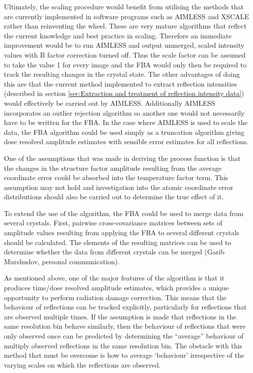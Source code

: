 Ultimately, the scaling procedure would benefit from utilising the methods that are currently implemented in software programs such as AIMLESS and XSCALE rather than reinventing the wheel.
These are very mature algorithms that reflect the current knowledge and best practice in scaling.
Therefore an immediate improvement would be to run AIMLESS and output unmerged, scaled intensity values with B factor correction turned off.
Thus the scale factor can be assumed to take the value 1 for every image and the FBA would only then be required to track the resulting changes in the crystal state.
The other advantages of doing this are that the current method implemented to extract reflection intensities (described in section \ref{sec:Extraction and treatment of reflection intensity data}) would effectively be carried out by AIMLESS.
Additionally AIMLESS incorporates an outlier rejection algorithm so another one would not necessarily have to be written for the FBA.
In the case where AIMLESS is used to scale the data, the FBA algorithm could be used simply as a truncation algorithm giving dose resolved amplitude estimates with sensible error estimates for all reflections.

One of the assumptions that was made in deriving the process function is that the changes in the structure factor amplitude resulting from the average coordinate error could be absorbed into the temperature factor term.
This assumption may not hold and investigation into the atomic coordinate error distributions should also be carried out to determine the true effect of it.

To extend the use of the algorithm, the FBA could be used to merge data from several crystals.
First, pairwise cross-covariance matrices between sets of amplitude values resulting from applying the FBA to several different crystals should be calculated.
The elements of the resulting matrices can be used to determine whether the data from different crystals can be merged (Garib Murshudov, personal communication).

As mentioned above, one of the major features of the algorithm is that it produces time/dose resolved amplitude estimates, which provides a unique opportunity to perform radiation damage correction.
This means that the behaviour of reflections can be tracked explicitly, particularly for reflections that are observed multiple times.
If the assumption is made that reflections in the same resolution bin behave similarly, then the behaviour of reflections that were only observed once can be predicted by determining the ``average'' behaviour of multiply observed reflections in the same resolution bin.
The obstacle with this method that must be overcome is how to average `behaviour' irrespective of the varying scales on which the reflections are observed.

